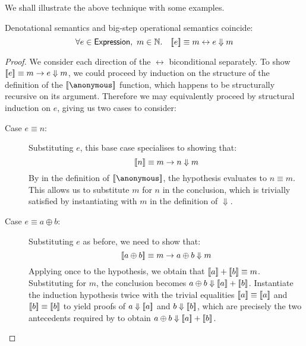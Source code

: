 We shall illustrate the above technique with some examples.

\begin{theorem}
Denotational semantics and big-step operational semantics coincide:
\[
	\forall e \in \Expression,\ m \in \Nat.\quad
		\sb[e] \equiv m \leftrightarrow e \Downarrow m
\]
\end{theorem}

\begin{proof}
We consider each direction of the $\leftrightarrow$ biconditional
separately. To show $\sb[e] \equiv m \rightarrow e \Downarrow m$, we could
proceed by induction on the structure of the definition of the
$\sb[\anonymous]$ function, which happens to be structurally recursive on
its argument. Therefore we may equivalently proceed by structural induction
on $e$, giving us two cases to consider:
\begin{description}
\item[Case $e \equiv n$:]%
Substituting $e$, this base case specialises to showing that:
\[
	\sb[n] \equiv m \rightarrow n \Downarrow m
\]
By  in the definition of $\sb[\anonymous]$, the
hypothesis evaluates to $n \equiv m$. This allows us to substitute $m$ for
$n$ in the conclusion, which is trivially satisfied by instantiating
 with $m$ in the definition of ${\Downarrow}$.
\item[Case $e \equiv a \oplus b$:]%
Substituting $e$ as before, we need to show that:
\[
	\sb[a \oplus b] \equiv m \rightarrow a \oplus b \Downarrow m
\]
Applying  once to the hypothesis, we obtain that $\sb[a]
+ \sb[b] \equiv m$. Substituting for $m$, the conclusion becomes $a \oplus
b \Downarrow \sb[a] + \sb[b]$. Instantiate the induction hypothesis twice
with the trivial equalities $\sb[a] \equiv \sb[a]$ and $\sb[b] \equiv
\sb[b]$ to yield proofs of $a \Downarrow \sb[a]$ and $b \Downarrow \sb[b]$,
which are precisely the two antecedents required by  to
obtain $a \oplus b \Downarrow \sb[a] + \sb [b]$.
\end{description}


\end{proof}
